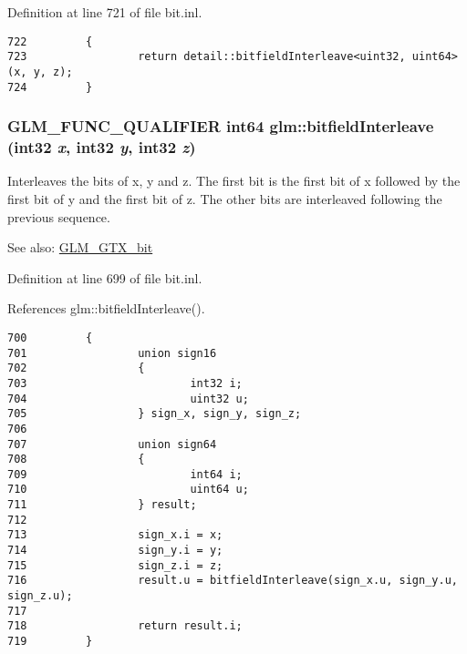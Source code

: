 Definition at line 721 of file bit.inl.

\begin{Code}\begin{verbatim}722         {
723                 return detail::bitfieldInterleave<uint32, uint64>(x, y, z);
724         }
\end{verbatim}
\end{Code}


\hypertarget{group__gtx__bit_g64e2d84f6560af3cc639644b1e628c42}{
\subsubsection[bitfieldInterleave]{\setlength{\rightskip}{0pt plus 5cm}GLM\_\-FUNC\_\-QUALIFIER int64 glm::bitfieldInterleave (int32 {\em x}, \/  int32 {\em y}, \/  int32 {\em z})}}
\label{group__gtx__bit_g64e2d84f6560af3cc639644b1e628c42}


Interleaves the bits of x, y and z. The first bit is the first bit of x followed by the first bit of y and the first bit of z. The other bits are interleaved following the previous sequence.

\begin{Desc}
\item[See also:]\hyperlink{group__gtx__bit}{GLM\_\-GTX\_\-bit} \end{Desc}


Definition at line 699 of file bit.inl.

References glm::bitfieldInterleave().

\begin{Code}\begin{verbatim}700         {
701                 union sign16
702                 {
703                         int32 i;
704                         uint32 u;
705                 } sign_x, sign_y, sign_z;
706 
707                 union sign64
708                 {
709                         int64 i;
710                         uint64 u;
711                 } result;
712 
713                 sign_x.i = x;
714                 sign_y.i = y;
715                 sign_z.i = z;
716                 result.u = bitfieldInterleave(sign_x.u, sign_y.u, sign_z.u);
717 
718                 return result.i;
719         }
\end{verbatim}
\end{Code}




